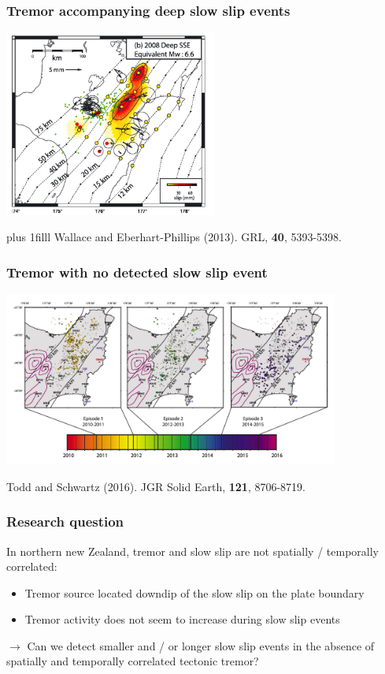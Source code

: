 \documentclass{beamer}
\newcommand{\btVFill}{\vskip0pt plus 1filll}
\begin{document}
	\begin{frame}
		\frametitle{Tremor accompanying deep slow slip events}
		\begin{center}
			\includegraphics[trim={0cm 0cm 0cm 0cm}, clip, width=7cm]{articles/wallace_eberhart-phillips_2013_3b.png}
		\end{center}
		\btVFill
		\tiny{Wallace and Eberhart-Phillips (2013). GRL, \textbf{40}, 5393-5398.}
	\end{frame}

	\begin{frame}
		\frametitle{Tremor with no detected slow slip event}
		\begin{center}
			\includegraphics[trim={0cm 0cm 0cm 0cm}, clip, width=11cm]{articles/todd_schwartz_2016_6.png}
		\end{center}
		\tiny{Todd and Schwartz (2016). JGR Solid Earth, \textbf{121}, 8706-8719.}
	\end{frame}

	\begin{frame}
		\frametitle{Research question}
		In northern new Zealand, tremor and slow slip are not spatially / temporally correlated:
		\begin{itemize}
			\item Tremor source located downdip of the slow slip on the plate boundary
			\item Tremor activity does not seem to increase during slow slip events
		\end{itemize}

		\begin{block}{}
			$\rightarrow$ Can we detect smaller and / or longer slow slip events in the absence of spatially and temporally correlated tectonic tremor?
		\end{block}			
	\end{frame}
\end{document}
